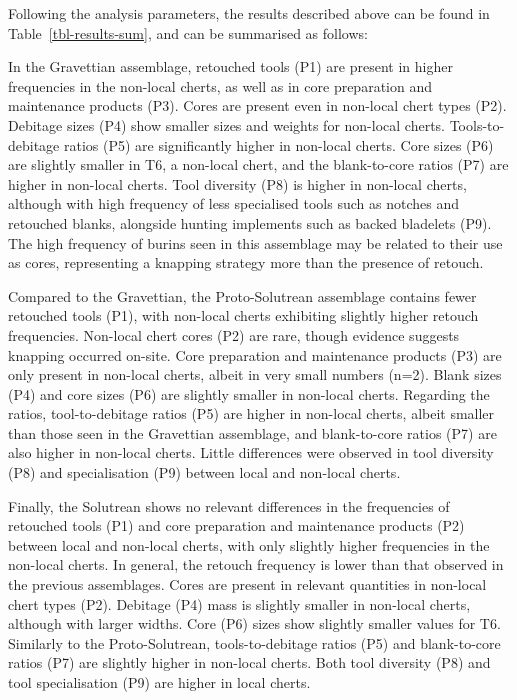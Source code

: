 \documentclass[
  a4paper,
  DIV=11,
  numbers=noendperiod]{scrreprt}
\begin{document}
Following the analysis parameters, the results described above can be
found in Table~\ref{tbl-results-sum}, and can be summarised as follows:

In the Gravettian assemblage, retouched tools (P1) are present in higher
frequencies in the non-local cherts, as well as in core preparation and
maintenance products (P3). Cores are present even in non-local chert
types (P2). Debitage sizes (P4) show smaller sizes and weights for
non-local cherts. Tools-to-debitage ratios (P5) are significantly higher
in non-local cherts. Core sizes (P6) are slightly smaller in T6, a
non-local chert, and the blank-to-core ratios (P7) are higher in
non-local cherts. Tool diversity (P8) is higher in non-local cherts,
although with high frequency of less specialised tools such as notches
and retouched blanks, alongside hunting implements such as backed
bladelets (P9). The high frequency of burins seen in this assemblage may
be related to their use as cores, representing a knapping strategy more
than the presence of retouch.

Compared to the Gravettian, the Proto-Solutrean assemblage contains
fewer retouched tools (P1), with non-local cherts exhibiting slightly
higher retouch frequencies. Non-local chert cores (P2) are rare, though
evidence suggests knapping occurred on-site. Core preparation and
maintenance products (P3) are only present in non-local cherts, albeit
in very small numbers (n=2). Blank sizes (P4) and core sizes (P6) are
slightly smaller in non-local cherts. Regarding the ratios,
tool-to-debitage ratios (P5) are higher in non-local cherts, albeit
smaller than those seen in the Gravettian assemblage, and blank-to-core
ratios (P7) are also higher in non-local cherts. Little differences were
observed in tool diversity (P8) and specialisation (P9) between local
and non-local cherts.

Finally, the Solutrean shows no relevant differences in the frequencies
of retouched tools (P1) and core preparation and maintenance products
(P2) between local and non-local cherts, with only slightly higher
frequencies in the non-local cherts. In general, the retouch frequency
is lower than that observed in the previous assemblages. Cores are
present in relevant quantities in non-local chert types (P2). Debitage
(P4) mass is slightly smaller in non-local cherts, although with larger
widths. Core (P6) sizes show slightly smaller values for T6. Similarly
to the Proto-Solutrean, tools-to-debitage ratios (P5) and blank-to-core
ratios (P7) are slightly higher in non-local cherts. Both tool diversity
(P8) and tool specialisation (P9) are higher in local cherts.
\end{document}
